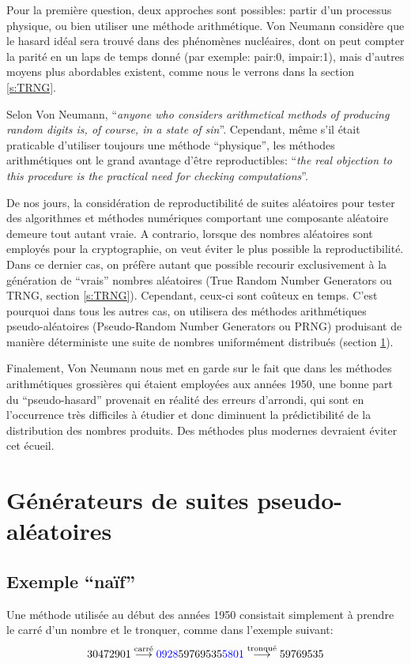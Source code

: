 \documentclass{scrartcl}
\begin{document}
Pour la première question, deux approches sont possibles: partir d'un processus
physique, ou bien utiliser une méthode arithmétique. Von Neumann considère que
le hasard idéal sera trouvé dans des phénomènes nucléaires, dont on peut compter
la parité en un laps de temps donné (par exemple: pair:0, impair:1), mais
d'autres moyens plus abordables existent, comme nous le verrons dans la section
\ref{s:TRNG}.

Selon Von Neumann, ``\textit{anyone who considers arithmetical methods of
  producing random digits is, of course, in a state of sin}''.  Cependant, même
s'il était praticable d'utiliser toujours une méthode ``physique'', les méthodes
arithmétiques ont le grand avantage d'être reproductibles: ``\textit{the real
  objection to this procedure is the practical need for checking
  computations}''.
\par\medskip

De nos jours, la considération de reproductibilité de suites aléatoires pour
tester des algorithmes et méthodes numériques comportant une composante
aléatoire demeure tout autant vraie. A contrario, lorsque des nombres aléatoires
sont employés pour la cryptographie, on veut éviter le plus possible la
reproductibilité. Dans ce dernier cas, on préfère autant que possible recourir
exclusivement à la génération de ``vrais'' nombres aléatoires (True Random
Number Generators ou TRNG, section \ref{s:TRNG}). Cependant, ceux-ci sont
coûteux en temps. C'est pourquoi dans tous les autres cas, on utilisera des
méthodes arithmétiques pseudo-aléatoires (Pseudo-Random Number Generators ou
PRNG) produisant de manière déterministe une suite de nombres uniformément
distribués (section \ref{s:PRNG}).
\par\medskip

Finalement, Von Neumann nous met en garde sur le fait que dans les méthodes
arithmétiques grossières qui étaient employées aux années 1950, une bonne part
du ``pseudo-hasard'' provenait en réalité des erreurs d'arrondi, qui sont en
l'occurrence très difficiles à étudier et donc diminuent la prédictibilité de la
distribution des nombres produits. Des méthodes plus modernes devraient éviter
cet écueil.


\section{Générateurs de suites pseudo-aléatoires}\label{s:PRNG}

\subsection{Exemple ``naïf''}
Une méthode utilisée au début des années 1950 consistait simplement à prendre le
carré d'un nombre et le tronquer, comme dans l'exemple suivant:
\[
  30472901 \overset{\text{carré}}\longrightarrow {\color{blue}0928}59769535{\color{blue}5801}
  \overset{\text{tronqué}}\longrightarrow 59769535
\]
\end{document}
